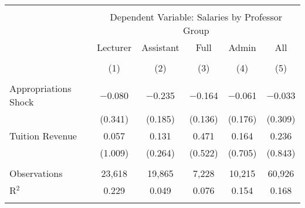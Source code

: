 
\begin{tabular}{@{\extracolsep{5pt}}lccccc} 
\\[-1.8ex]\hline 
\hline \\[-1.8ex] 
 & \multicolumn{5}{c}{Dependent Variable: Salaries by Professor Group} \\ 
\cline{2-6} 
 & Lecturer & Assistant & Full & Admin & All \\ 
\\[-1.8ex] & (1) & (2) & (3) & (4) & (5)\\ 
\hline \\[-1.8ex] 
 Appropriations Shock & $-$0.080 & $-$0.235 & $-$0.164 & $-$0.061 & $-$0.033 \\ 
  & (0.341) & (0.185) & (0.136) & (0.176) & (0.309) \\ 
  Tuition Revenue & 0.057 & 0.131 & 0.471 & 0.164 & 0.236 \\ 
  & (1.009) & (0.264) & (0.522) & (0.705) & (0.843) \\ 
 \hline \\[-1.8ex] 
Observations & 23,618 & 19,865 & 7,228 & 10,215 & 60,926 \\ 
R$^{2}$ & 0.229 & 0.049 & 0.076 & 0.154 & 0.168 \\ 
\hline 
\hline \\[-1.8ex] 
\end{tabular} 
